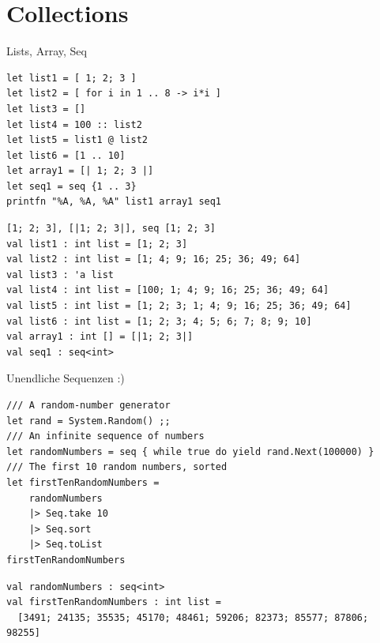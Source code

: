 \documentclass[t]{beamer}
\begin{document}
\section{Collections }
\label{sec:org7aee9cd}

\begin{frame}[label={sec:org9f20bad},fragile]{Lists, Array, Seq}
 \scriptsize

\begin{verbatim}
let list1 = [ 1; 2; 3 ]
let list2 = [ for i in 1 .. 8 -> i*i ]
let list3 = []
let list4 = 100 :: list2
let list5 = list1 @ list2
let list6 = [1 .. 10]
let array1 = [| 1; 2; 3 |]
let seq1 = seq {1 .. 3}
printfn "%A, %A, %A" list1 array1 seq1
\end{verbatim}

\begin{verbatim}
[1; 2; 3], [|1; 2; 3|], seq [1; 2; 3]
val list1 : int list = [1; 2; 3]
val list2 : int list = [1; 4; 9; 16; 25; 36; 49; 64]
val list3 : 'a list
val list4 : int list = [100; 1; 4; 9; 16; 25; 36; 49; 64]
val list5 : int list = [1; 2; 3; 1; 4; 9; 16; 25; 36; 49; 64]
val list6 : int list = [1; 2; 3; 4; 5; 6; 7; 8; 9; 10]
val array1 : int [] = [|1; 2; 3|]
val seq1 : seq<int>
\end{verbatim}
\end{frame}

\begin{frame}[label={sec:org2f5a9e9},fragile]{Unendliche Sequenzen :)}
 \begin{verbatim}
/// A random-number generator 
let rand = System.Random() ;;
/// An infinite sequence of numbers
let randomNumbers = seq { while true do yield rand.Next(100000) }
/// The first 10 random numbers, sorted
let firstTenRandomNumbers = 
    randomNumbers
    |> Seq.take 10 
    |> Seq.sort
    |> Seq.toList
firstTenRandomNumbers
\end{verbatim}

\begin{verbatim}
val randomNumbers : seq<int>
val firstTenRandomNumbers : int list =
  [3491; 24135; 35535; 45170; 48461; 59206; 82373; 85577; 87806; 98255]
\end{verbatim}
\end{frame}
\end{document}
